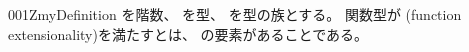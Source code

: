 \documentclass[index]{subfiles}
\begin{document}
\begin{myBlock}{001Z}{myDefinition}
  を階数、
  を型、
  を型の族とする。
  関数型が
  (function extensionality)を満たすとは、
  の要素があることである。
\end{myBlock}
\end{document}
